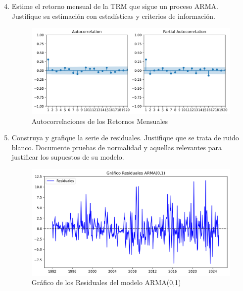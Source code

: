 \documentclass{article}
\theoremstyle{remark}
\theoremstyle{definition}
\begin{document}
\begin{enumerate}[label = \emph{\alph*})]\setcounter{enumi}{3}
    \item {Estime el retorno mensual de la TRM que sigue un proceso ARMA. Justifique su estimaci\'on con estad\'isticas y criterios de informaci\'on.}
        \begin{tcolorbox}[title=Soluci\'on 2.d]
            
            \begin{figure}[H]
                \centering
                \includegraphics[width=0.9\linewidth]{output/acf_pacf_retornos.png}
                \caption{Autocorrelaciones de los Retornos Mensuales}
                \label{fig:corr_ret}
            \end{figure}
            
            
        \end{tcolorbox}
    \item {Construya y grafique la serie de residuales. Justifique que se trata de ruido blanco. Documente pruebas de normalidad y aquellas relevantes para justificar los supuestos de su modelo.}
        \begin{tcolorbox}[title=Soluci\'on 2.e]
            \begin{figure}[H]
                \centering
                \includegraphics[width=0.9\linewidth]{output/graf_resid.png}
                \caption{Gr\'afico de los Residuales del modelo ARMA(0,1)}

\end{figure}
\end{tcolorbox}
\end{enumerate}
\end{document}
